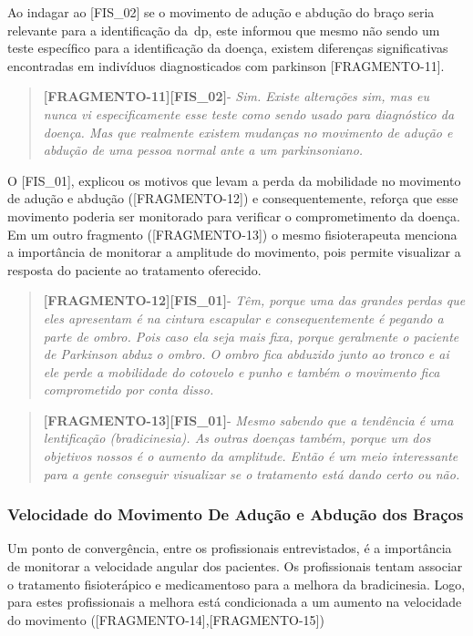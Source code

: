 
Ao indagar ao [FIS\_02] se o movimento de adução e abdução do braço seria relevante para a identificação da~\ac{dp}, este informou que mesmo não sendo um teste específico para a identificação da doença, existem diferenças significativas encontradas em indivíduos diagnosticados com parkinson [FRAGMENTO-11].
\begin{quote}
\textbf{[FRAGMENTO-11][FIS\_02]}-
\emph{
Sim. Existe alterações sim, mas eu nunca vi especificamente esse teste como sendo usado para diagnóstico da doença. Mas que realmente existem mudanças no movimento de adução e abdução de uma pessoa normal ante a um parkinsoniano.
}
\end{quote}

O [FIS\_01], explicou os motivos que levam a perda da mobilidade no movimento de adução e abdução ([FRAGMENTO-12]) e consequentemente, reforça que esse movimento poderia ser monitorado para verificar o comprometimento da doença. Em um outro fragmento ([FRAGMENTO-13]) o mesmo fisioterapeuta menciona a importância de monitorar a amplitude do movimento, pois permite visualizar a resposta do paciente ao tratamento oferecido.

\begin{quote}
\textbf{[FRAGMENTO-12][FIS\_01]}-
\emph{
Têm, porque uma das grandes perdas que eles apresentam é na cintura escapular e consequentemente é pegando a parte de ombro. Pois caso ela seja mais fixa, porque geralmente o paciente de Parkinson abduz o ombro. O ombro fica abduzido junto ao tronco e ai ele perde a mobilidade do cotovelo e punho e também o movimento fica comprometido por conta disso.
}
\end{quote}

\begin{quote}
\textbf{[FRAGMENTO-13][FIS\_01]}-
\emph{
Mesmo sabendo que a tendência é uma lentificação (bradicinesia).  As outras doenças também, porque um dos objetivos nossos é o aumento da amplitude. Então é um meio interessante para a gente conseguir visualizar se o tratamento está dando certo ou não.
}
\end{quote}



\subsubsection{Velocidade do Movimento De Adução e Abdução dos Braços}
Um ponto de convergência, entre os profissionais entrevistados, é a importância de monitorar a velocidade angular dos pacientes. Os profissionais tentam associar o tratamento fisioterápico e medicamentoso para a melhora da bradicinesia. Logo, para estes profissionais a melhora está condicionada a um aumento na velocidade do movimento ([FRAGMENTO-14],[FRAGMENTO-15])

